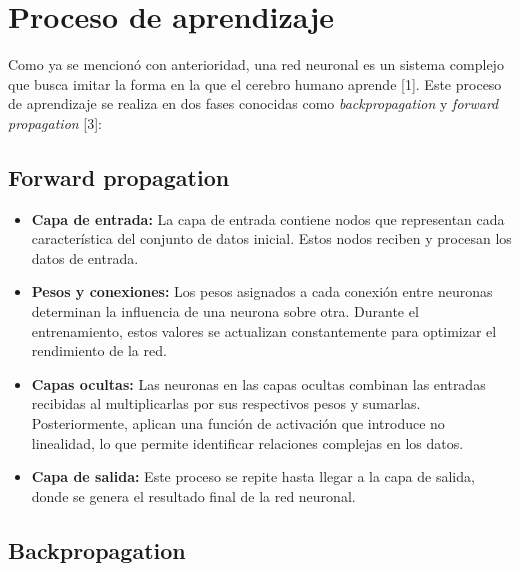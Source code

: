 \section{Proceso de aprendizaje}
Como ya se mencionó con anterioridad, una red neuronal es un sistema complejo que busca imitar la forma en la que el cerebro humano aprende [1].
Este proceso de aprendizaje se realiza en dos fases conocidas como \textit{backpropagation} y \textit{forward propagation} [3]:


\subsection{Forward propagation}

\begin{itemize}
	\item \textbf{Capa de entrada:} La capa de entrada contiene nodos que representan cada característica del conjunto de datos inicial. Estos nodos reciben y procesan los datos de entrada.  
	\item \textbf{Pesos y conexiones:} Los pesos asignados a cada conexión entre neuronas determinan la influencia de una neurona sobre otra. Durante el entrenamiento, estos valores se actualizan constantemente para optimizar el rendimiento de la red.  
	\item \textbf{Capas ocultas:} Las neuronas en las capas ocultas combinan las entradas recibidas al multiplicarlas por sus respectivos pesos y sumarlas. Posteriormente, aplican una función de activación que introduce no linealidad, lo que permite identificar relaciones complejas en los datos.  
	\item \textbf{Capa de salida:} Este proceso se repite hasta llegar a la capa de salida, donde se genera el resultado final de la red neuronal.
\end{itemize}



\subsection{Backpropagation}

